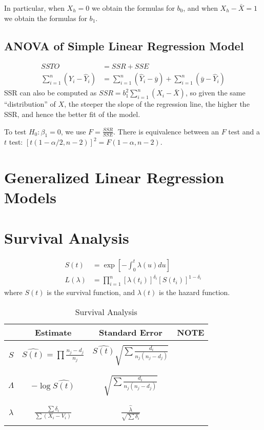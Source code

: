 In particular, when $X_h = 0$ we obtain the formulas for $b_0$, and when $X_h - \bar X = 1$ we obtain the formulas for $b_1$.

\subsection{ANOVA of Simple Linear Regression Model}
\begin{align}
	SSTO &= SSR + SSE\\
	\sum_{i=1}^n (Y_i - \hat Y_i) &= \sum_{i=1}^n (\hat Y_i - \bar y) + \sum_{i=1}^n (\bar y - \hat Y_i)
\end{align}
SSR can also be computed as $SSR = b_1^2 \sum_{i=1}^n (X_i - \bar X)$, so given the same ``distribution'' of $X$, the steeper the slope of the regression line, the higher the SSR, and hence the better fit of the model.

To test $H_0: \beta_1 = 0$, we use $F = \frac{SSR}{SSE}$. There is equivalence between an $F$ test and a $t$ test: $[t(1-\alpha/2,n-2)]^2 = F(1-\alpha,n-2)$.

\section{Generalized Linear Regression Models}
\section{Survival Analysis}
\begin{align}
	S(t) &= \exp \left[-\int_0^t \lambda(u) du \right] \\
	L(\lambda) &= \prod_{i=1}^n [\lambda(t_i)]^{\delta_i} [S(t_i)]^{1-\delta_i}
\end{align}
where $S(t)$ is the survival function, and $\lambda(t)$ is the hazard function.

\begin{table}[h]
\centering
\begin{tabular}{c || c c c }
\hline
& {Estimate} & {Standard Error} & {NOTE} \\
\hline
\\
$S$& $\hat{S(t)} = \prod \frac{n_j-d_j}{n_j}$ & $\hat{S(t)} \sqrt{\sum \frac{d_i}{n_j(n_j-d_j)}}$ &\\
\\
\hline
\\
$\Lambda$& $-\log \hat{S(t)}$ & $\sqrt{\sum \frac{d_i}{n_j(n_j-d_j)}}$& \\
\\
\hline
\\
$\lambda$& $\frac{\sum \delta_i}{\sum (X_i-V_i)}$ & $\frac{\hat \lambda}{\sqrt{\sum \delta_i}}$\\
\\
\hline
\end{tabular}
\caption{Survival Analysis}
\end{table}

